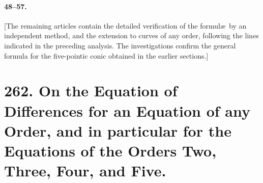 \documentclass[11pt,a4paper]{book}
\begin{document}
\paragraph{48--57.}
[The  remaining  articles  contain  the  detailed  verification  of  the  formul\ae\  by  an
independent  method,  and  the  extension  to  curves  of  any  order,  following  the  lines
indicated  in  the  preceding  analysis.  The  investigations  confirm  the  general  formula
for  the  five-pointic  conic  obtained  in  the  earlier  sections.]


\newpage
\section*{262. On the Equation of Differences for an Equation of any Order, and in particular for the Equations of the Orders Two, Three, Four, and Five.}
\label{sec:paper262}


\medskip
\end{document}
